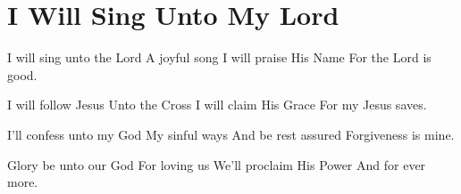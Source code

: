 \starttocol
\chapter{I Will Sing Unto My Lord}
\nexttocol
\hfill{\it }
\stoptocol
\starttocol
\startlines
I {\sc will} sing unto the Lord
A joyful song
I will praise His Name
For the Lord is good.

I will follow Jesus
Unto the Cross
I will claim His Grace
For my Jesus saves.

I'll confess unto my God
My sinful ways
And be rest assured
Forgiveness is mine.

Glory be unto our God
For loving us
We'll proclaim His Power
And for ever more.
\stoplines
\nexttocol

\stoptocol
